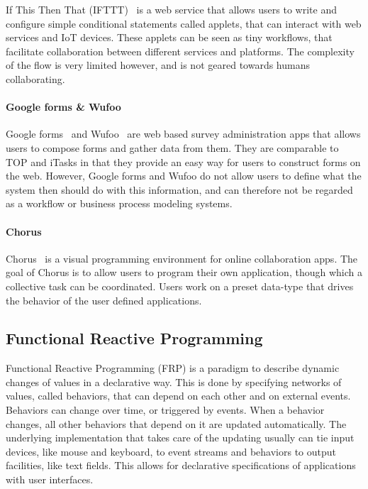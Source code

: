 If This Then That (IFTTT)~\cite{IFTTT} is a web service that allows users to write and
configure simple conditional statements called applets, that can interact with
web services and IoT devices. These applets can be seen as tiny workflows, that
facilitate collaboration between different services and platforms. The
complexity of the flow is very limited however, and is not geared towards humans
collaborating.

\paragraph{Google forms \& Wufoo}

Google forms~\cite{googleforms} and Wufoo~\cite{wufoo} are web based survey administration apps that allows
users to compose forms and gather data from them. They are comparable to TOP and
iTasks in that they provide an easy way for users to construct forms on the web.
However, Google forms and Wufoo do not allow users to define what the system
then should do with this information, and can therefore not be regarded as a
workflow or business process modeling systems.

\paragraph{Chorus} %

Chorus~\cite{chen2017chorus} is a visual programming environment for online
collaboration apps. The goal of Chorus is to allow users to program their own
application, though which a collective task can be coordinated. Users work on a
preset data-type that drives the behavior of the user defined applications.


\subsection{Functional Reactive Programming}

Functional Reactive Programming (FRP) is a paradigm to describe dynamic changes of values in a declarative way.
This is done by specifying networks of values, called behaviors, that can depend on each other and on external events.
Behaviors can change over time, or triggered by events.
When a behavior changes, all other behaviors that depend on it are updated automatically.
The underlying implementation that takes care of the updating usually can tie input devices, like mouse and keyboard, to event streams and behaviors to output facilities, like text fields.
This allows for declarative specifications of applications with user interfaces.

